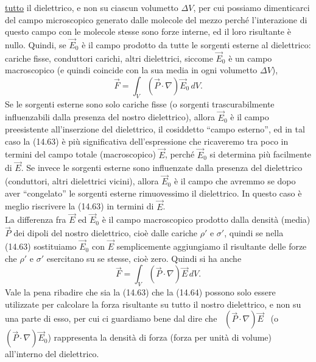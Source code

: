 \underline{tutto} il dielettrico, e non su ciascun volumetto $\Delta V$, per cui
possiamo dimenticarci del campo microscopico generato dalle molecole del mezzo
perch\'e l'interazione di questo campo con le molecole stesse sono forze
interne, ed il loro risultante \`e nullo. Quindi, se $\vec E_0$ \`e il campo
prodotto da tutte le sorgenti esterne al dielettrico: cariche fisse, conduttori
carichi, altri dielettrici, siccome $\vec E_0$ \`e un campo macroscopico (e
quindi coincide con la sua media in ogni volumetto $\Delta V$),
\begin{equation}
  \vec F=\int_V(\vec P\cdot\nabla)\vec E_0\,dV.
  \tag{14.63}
\end{equation}
Se le sorgenti esterne sono solo cariche fisse (o sorgenti trascurabilmente
influenzabili dalla presenza del nostro dielettrico), allora $\vec E_0$ \`e il
campo preesistente all'inserzione del dielettrico, il cosiddetto ``campo
esterno'', ed in tal caso la (14.63) \`e pi\`u significativa dell'espressione
che ricaveremo tra poco in termini del campo totale (macroscopico) $\vec E$,
perch\'e $\vec E_0$ si determina pi\`u facilmente di $\vec E$. Se invece le
sorgenti esterne sono influenzate dalla presenza del dielettrico (conduttori,
altri dielettrici vicini), allora $\vec E_0$ \`e il campo che avremmo se dopo
aver ``congelato'' le sorgenti esterne rimuovessimo il dielettrico. In questo
caso \`e meglio riscrivere la (14.63) in termini di $\vec E$.\\
La differenza fra $\vec E$ ed $\vec E_0$ \`e il campo macroscopico prodotto
dalla densit\`a (media) $\vec P$ dei dipoli del nostro dielettrico, cio\`e dalle
cariche $\rho'$ e $\sigma'$, quindi se nella (14.63) sostituiamo $\vec E_0$ con
$\vec E$ semplicemente aggiungiamo il risultante delle forze che $\rho'$ e
$\sigma'$ esercitano su se stesse, cio\`e zero. Quindi si ha anche
\begin{equation}
  \vec F=\int_V(\vec P\cdot\nabla)\vec E\,dV.
  \tag{14.64}
\end{equation}
Vale la pena ribadire che sia la (14.63) che la (14.64) possono solo essere
utilizzate per calcolare la forza risultante su tutto il nostro dielettrico, e
non su una parte di esso, per cui ci guardiamo bene dal dire che
\ $(\vec P\cdot\nabla)\vec E$ \ \big(o \ $(\vec P\cdot\nabla)\vec E_0$\big)
rappresenta la densit\`a di forza (forza per unit\`a di volume) all'interno del
dielettrico.

